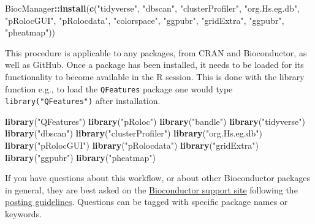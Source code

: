 \documentclass[9pt,a4paper,]{extarticle}
\newenvironment{Shaded}{\begin{snugshade}}{\end{snugshade}}
\newcommand{\FunctionTok}[1]{\textcolor[rgb]{0.13,0.29,0.53}{\textbf{#1}}}
\newcommand{\NormalTok}[1]{#1}
\newcommand{\SpecialCharTok}[1]{\textcolor[rgb]{0.81,0.36,0.00}{\textbf{#1}}}
\newcommand{\StringTok}[1]{\textcolor[rgb]{0.31,0.60,0.02}{#1}}
\begin{document}
\begin{Shaded}
\begin{Highlighting}[]
\NormalTok{BiocManager}\SpecialCharTok{::}\FunctionTok{install}\NormalTok{(}\FunctionTok{c}\NormalTok{(}\StringTok{"tidyverse"}\NormalTok{,}
                       \StringTok{"dbscan"}\NormalTok{,}
                       \StringTok{"clusterProfiler"}\NormalTok{,}
                       \StringTok{"org.Hs.eg.db"}\NormalTok{,}
                       \StringTok{"pRolocGUI"}\NormalTok{,}
                       \StringTok{"pRolocdata"}\NormalTok{,}
                       \StringTok{"colorspace"}\NormalTok{,}
                       \StringTok{"ggpubr"}\NormalTok{, }
                       \StringTok{"gridExtra"}\NormalTok{,}
                       \StringTok{"ggpubr"}\NormalTok{,}
                       \StringTok{"pheatmap"}\NormalTok{))}
\end{Highlighting}
\end{Shaded}

This procedure is applicable to any packages, from CRAN and Bioconductor,
as well as GitHub. Once a package has been installed, it needs to be loaded for
its functionality to become available in the R session. This is done with the
library function e.g., to load the \texttt{QFeatures} package one would type
\texttt{library("QFeatures")} after installation.

\begin{Shaded}
\begin{Highlighting}[]
\FunctionTok{library}\NormalTok{(}\StringTok{"QFeatures"}\NormalTok{)}
\FunctionTok{library}\NormalTok{(}\StringTok{"pRoloc"}\NormalTok{)}
\FunctionTok{library}\NormalTok{(}\StringTok{"bandle"}\NormalTok{)}
\FunctionTok{library}\NormalTok{(}\StringTok{"tidyverse"}\NormalTok{)}
\FunctionTok{library}\NormalTok{(}\StringTok{"dbscan"}\NormalTok{)}
\FunctionTok{library}\NormalTok{(}\StringTok{"clusterProfiler"}\NormalTok{)}
\FunctionTok{library}\NormalTok{(}\StringTok{"org.Hs.eg.db"}\NormalTok{)}
\FunctionTok{library}\NormalTok{(}\StringTok{"pRolocGUI"}\NormalTok{)}
\FunctionTok{library}\NormalTok{(}\StringTok{"pRolocdata"}\NormalTok{)}
\FunctionTok{library}\NormalTok{(}\StringTok{"gridExtra"}\NormalTok{)}
\FunctionTok{library}\NormalTok{(}\StringTok{"ggpubr"}\NormalTok{)}
\FunctionTok{library}\NormalTok{(}\StringTok{"pheatmap"}\NormalTok{)}
\end{Highlighting}
\end{Shaded}

If you have questions about this workflow, or about other Bioconductor packages
in general, they are best asked on the \href{https://support.bioconductor.org}{Bioconductor support site}
following the \href{http://www.bioconductor.org/help/support/posting-guide/}{posting guidelines}.
Questions can be tagged with specific package names or keywords.
\end{document}
